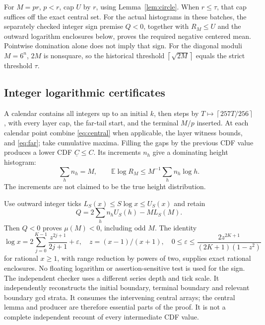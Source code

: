 \documentclass[11pt]{article}
\theoremstyle{definition}\newtheorem{definition}[theorem]{Definition}
\theoremstyle{remark}\newtheorem{remark}[theorem]{Remark}
\newcommand{\E}{\mathbb E}
\newcommand{\ceil}[1]{\left\lceil #1\right\rceil}
\begin{document}
For \(M=pr\), \(p<r\), cap \(U\) by \(r\), using Lemma~\ref{lem:circle}.
When \(r\le\tau\), that cap suffices off the exact central set.
For the actual histograms in these batches, the separately checked
integer sign premise \(Q<0\), together with \(R_M\le U\) and the outward
logarithm enclosures below, proves the required negative centered mean.
Pointwise domination alone does not imply that sign.
For the diagonal moduli \(M=6^n\), \(2M\) is nonsquare, so the historical
threshold \(\ceil{\sqrt{2M}}\) equals the strict threshold \(\tau\).

\subsection{Integer logarithmic certificates}
A calendar contains all integers up to an initial \(k\), then steps by
\(T\mapsto\ceil{257T/256}\), with every layer cap, the far-tail start,
and the terminal \(M/p\) inserted. At each calendar point combine
\eqref{eq:central} when applicable, the layer witness bounds, and
\eqref{eq:far}; take cumulative maxima. Filling the gaps by the previous
CDF value produces a lower CDF \(\underline C\le C\).
Its increments \(n_h\) give a dominating height histogram:
\[
 \sum_hn_h=M,\qquad \E\log R_M\le M^{-1}\sum_hn_h\log h.
\]
The increments are not claimed to be the true height distribution.

Use outward integer ticks \(L_S(x)\le S\log x\le U_S(x)\) and retain
\[
 Q=2\sum_h n_h U_S(h)-M L_S(M).                    \tag{3.7}\label{eq:Q}
\]
Then \(Q<0\) proves \(\mu(M)<0\), including odd \(M\).
The identity
\[
 \log x=2\sum_{j=0}^{K-1}\frac{z^{2j+1}}{2j+1}
       +\varepsilon,\quad z=(x-1)/(x+1),\quad
 0\le\varepsilon\le
 \frac{2z^{2K+1}}{(2K+1)(1-z^2)}
\]
for rational \(x\ge1\), with range reduction by powers of two, supplies
exact rational enclosures. No floating logarithm or assertion-sensitive
test is used for the sign. The independent checker uses a different
series depth and tick scale.
It independently reconstructs the initial boundary, terminal boundary
and relevant boundary gcd strata. It consumes the intervening central
arrays; the central lemma and producer are therefore essential parts
of the proof. It is not a complete independent recount of every
intermediate CDF value.
\end{document}
